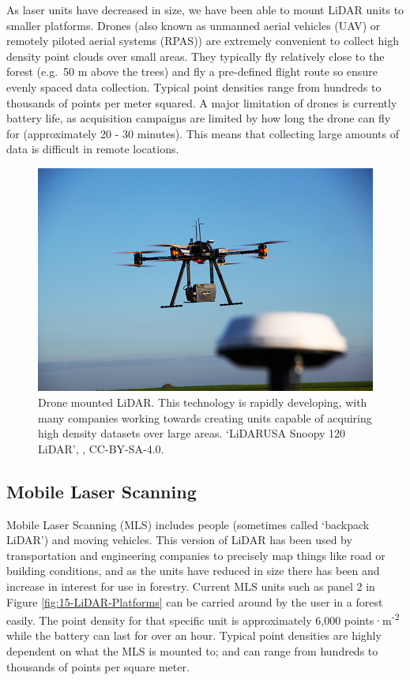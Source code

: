\documentclass[
]{book}
\begin{document}
As laser units have decreased in size, we have been able to mount LiDAR units to smaller platforms. Drones (also known as unmanned aerial vehicles (UAV) or remotely piloted aerial systems (RPAS)) are extremely convenient to collect high density point clouds over small areas. They typically fly relatively close to the forest (e.g.~50 m above the trees) and fly a pre-defined flight route so ensure evenly spaced data collection. Typical point densities range from hundreds to thousands of points per meter squared. A major limitation of drones is currently battery life, as acquisition campaigns are limited by how long the drone can fly for (approximately 20 - 30 minutes). This means that collecting large amounts of data is difficult in remote locations.



\begin{figure}
\includegraphics[width=0.75\linewidth]{images/15-LiDAR-on-Drone} \caption{Drone mounted LiDAR. This technology is rapidly developing, with many companies working towards creating units capable of acquiring high density datasets over large areas. `LiDARUSA Snoopy 120 LiDAR', \citep{mc_clapurhands_lidarusa_2019}, CC-BY-SA-4.0.}\label{fig:15-LiDAR-on-Drone}
\end{figure}

\subsection{Mobile Laser Scanning}\label{mobile-laser-scanning}

Mobile Laser Scanning (MLS) includes people (sometimes called `backpack LiDAR') and moving vehicles. This version of LiDAR has been used by transportation and engineering companies to precisely map things like road or building conditions, and as the units have reduced in size there has been and increase in interest for use in forestry. Current MLS units such as panel 2 in Figure \ref{fig:15-LiDAR-Platforms} can be carried around by the user in a forest easily. The point density for that specific unit is approximately 6,000 points·m\textsuperscript{-2} while the battery can last for over an hour. Typical point densities are highly dependent on what the MLS is mounted to; and can range from hundreds to thousands of points per square meter.
\end{document}
